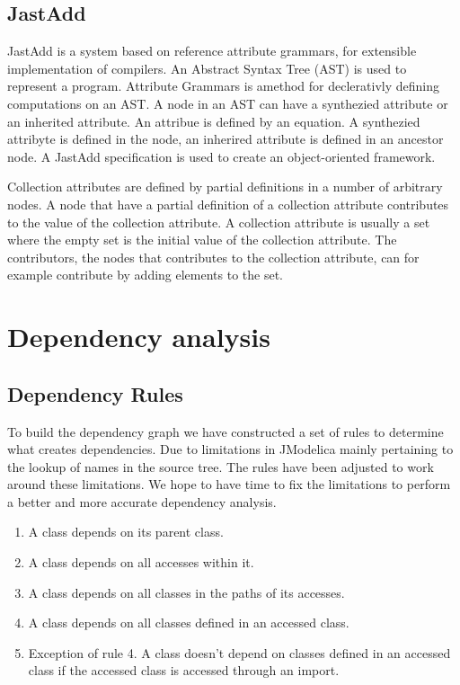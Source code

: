 \documentclass{cslthse-msc}
\begin{document}
\section{JastAdd}
JastAdd is a system based on reference attribute grammars, for extensible implementation of compilers. An Abstract Syntax Tree (AST) is used to represent a program. Attribute Grammars is amethod for declerativly defining computations on an AST. A node in an AST can have a synthezied attribute or an inherited attribute. An attribue is defined by an equation. A synthezied attribyte is defined in the node, an inherired attribute is defined in an ancestor node. A JastAdd specification is used to create an object-oriented framework.~\cite{aakesson2008development}

Collection attributes are defined by partial definitions in a number of arbitrary nodes. A node that have a partial definition of a collection attribute contributes to the value of the collection attribute. A collection attribute is usually a set where the empty set is the initial value of the collection attribute. The contributors, the nodes that contributes to the collection attribute, can for example contribute by adding elements to the set.~\cite{magnusson2007extending}

\chapter[Dependency analysis]{Dependency analysis}



\section{Dependency Rules}

To build the dependency graph we have constructed a set of rules to determine what creates dependencies. Due to limitations in JModelica mainly pertaining to the lookup of names in the source tree. The rules have been adjusted to work around these limitations. We hope to have time to fix the limitations to perform a better and more accurate dependency analysis. 

\begin{enumerate}
\item A class depends on its parent class. 
\item A class depends on all accesses within it.
\item A class depends on all classes in the paths of its accesses.
\item A class depends on all classes defined in an accessed class.
\item Exception of rule 4. A class doesn't depend on classes defined in an accessed class if the accessed class is accessed through an import.
\end{enumerate}
\end{document}
